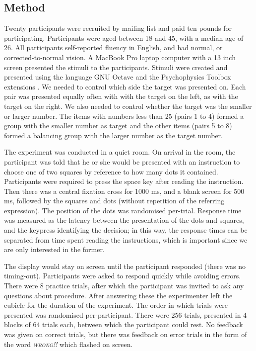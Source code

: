 \documentclass[graybox,envcountchap,sectrefs%
,footinfo
]{svmono}
\begin{document}

\subsection{Method}
Twenty participants were recruited by mailing list and paid ten pounds for participating. Participants were aged between 18 and 45, with a median age of 26. All participants self-reported fluency in English, and had normal, or corrected-to-normal vision. A MacBook Pro laptop computer with a 13 inch screen presented the stimuli to the participants. Stimuli were created and presented using the language GNU Octave \citep{eaton:2002} and the Psychophysics Toolbox extensions \citep{ptbx1, ptbx2}. We needed to control which side the target was presented on. Each pair was presented equally often with with the target on the left, as with the target on the right. We also needed to control whether the target was the smaller or larger number. The items with numbers less than 25 (pairs 1 to 4) formed a group with the smaller number as target and the other items (pairs 5 to 8) formed a balancing group with the larger number as the target number.

The experiment was conducted in a quiet room. On arrival in the room, the participant was told that he or she would be presented with an instruction to choose one of two squares by reference to how many dots it contained. Participants were required to press the space key after reading the instruction. Then there was a central fixation cross for 1000 ms, and a blank screen for 500 ms, followed by the squares and dots (without repetition of the referring expression).  The position of the dots was randomised per-trial. Response time was measured as the latency between the presentation of the dots and squares, and the keypress identifying the decision; in this way, the response times can be separated from time spent reading the instructions, which is important since we are only interested in the former.

The display would stay on screen until the participant responded (there was no timing-out). Participants were asked to respond quickly while avoiding errors. There were 8 practice trials, after which the participant was invited to ask any questions about procedure. After answering these the experimenter left the cubicle for the duration of the experiment. The order in which trials were presented was randomised per-participant. There were 256 trials, presented in 4 blocks of 64 trials each, between which the participant could rest. No feedback was given on correct trials, but there was feedback on error trials in the form of the word \emph{\textsc{wrong!!}} which flashed on screen.
\end{document}
